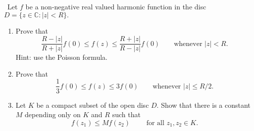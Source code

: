 \documentclass[12pt]{Homework}
\begin{document}
\begin{problem} $\,$
Let $f$ be a non-negative real valued harmonic function in the disc $D=\{z\in\mathbb{C}:|z|<R\}.$
\begin{enumerate}[label=(\alph*)]
    \item Prove that $$\frac{R-|z|}{R+|z|}f(0)\le f(z)\le\frac{R+|z|}{R-|z|}f(0)\qquad\text{whenever }|z|<R.$$ Hint: use the Poisson formula.
    \item Prove that $$\frac{1}{3}f(0)\le f(z)\le 3f(0)\qquad\text{whenever }|z|\le R/2.$$
    \item Let $K$ be a compact subset of the open disc $D.$ Show that there is a constant $M$ depending only on $K$ and $R$ such that $$f(z_1)\le Mf(z_2)\qquad\text{ for all }z_1,z_2\in K.$$
\end{enumerate}
\end{problem}
\end{document}

